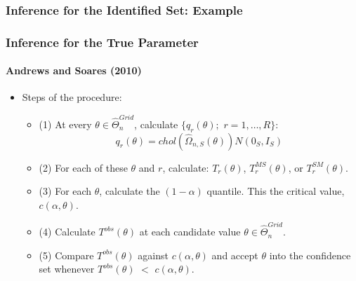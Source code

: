 \documentclass[10pt,letterpaper]{beamer}
\begin{document}

\begin{frame}
\frametitle{Inference for the Identified Set: Example}

\begin{figure}[h!]
\begin{center}
\end{center}
\end{figure}
\end{frame}


\begin{frame}
\frametitle{Inference for the True Parameter}
\framesubtitle{Andrews and Soares (2010)}

\begin{itemize}
\item Steps of the procedure: 

\begin{itemize}
\item (1) At every $\theta \in \widehat{\Theta }_{n}^{Grid}$, calculate $%
\{q_{r}(\theta );$ $r=1,\dots ,R\}$: 
\begin{equation*}
q_{r}(\theta )=chol(\widehat{\Omega }_{n,S}(\theta ))N(0_{S},I_{S})
\end{equation*}

\item (2) For each of these $\theta $ and $r$, calculate: $T_{r}(\theta )$, $%
T_{r}^{MS}(\theta )$, or $T_{r}^{SM}(\theta )$. 

\item (3) For each $\theta $, calculate the $(1-\alpha )$ quantile. This the
critical value, $c(\alpha ,\theta )$. 

\item (4) Calculate $T^{obs}(\theta )$ at each candidate value $\theta \in 
\widehat{\Theta }_{n}^{Grid}$. 

\item (5) Compare $T^{obs}(\theta )$ against $c(\alpha ,\theta )$ and accept 
$\theta $ into the confidence set whenever $T^{obs}(\theta )$ $<$ $c(\alpha
,\theta )$. 
\end{itemize}
\end{itemize}
\end{frame}
\end{document}
